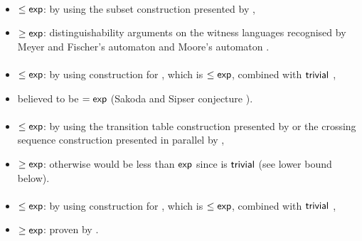 \paragraph{\ONFA{}\tto\ODFA}\label{cost:1NFAto1DFA}
\begin{itemize}
	\item $\le\mathsf{exp}$: by using the subset construction presented by ,
	\item $\ge\mathsf{exp}$: distinguishability arguments on the witness languages recognised by Meyer and Fischer's automaton \cite{MeyFis71} and Moore's automaton \cite{Moo71}.
\end{itemize}
\paragraph{\ONFA{}\tto\TDFA}
\begin{itemize}
	\item $\le\mathsf{exp}$: by using construction for \hyperref[cost:1NFAto1DFA]{\ONFA{}\tto\ODFA}, which is $\le\mathsf{exp}$, combined with $\mathsf{trivial}$ \ODFA{}\tto\TDFA,
	\item believed to be $=\mathsf{exp}$ (Sakoda and Sipser conjecture \cite{SakSip78}).
\end{itemize}
\paragraph{\TDFA{}\tto\ODFA}\label{cost:2DFAto1DFA}
\begin{itemize}
	\item $\le\mathsf{exp}$: by using the transition table construction presented by  or the crossing sequence construction presented in parallel by ,
	\item $\ge\mathsf{exp}$: otherwise \hyperref[cost:2DFAto1NFA]{\TDFA{}\tto\ONFA} would be less than $\mathsf{exp}$ since \ODFA{}\tto\ONFA is $\mathsf{trivial}$ (see lower bound below).
\end{itemize}
\paragraph{\TDFA{}\tto\ONFA}\label{cost:2DFAto1NFA}
\begin{itemize}
	\item $\le\mathsf{exp}$: by using construction for \hyperref[cost:2DFAto1DFA]{\TDFA{}\tto\ODFA}, which is $\le\mathsf{exp}$, combined with $\mathsf{trivial}$ \ODFA{}\tto\ONFA,
	\item $\ge\mathsf{exp}$: proven by .
\end{itemize}
